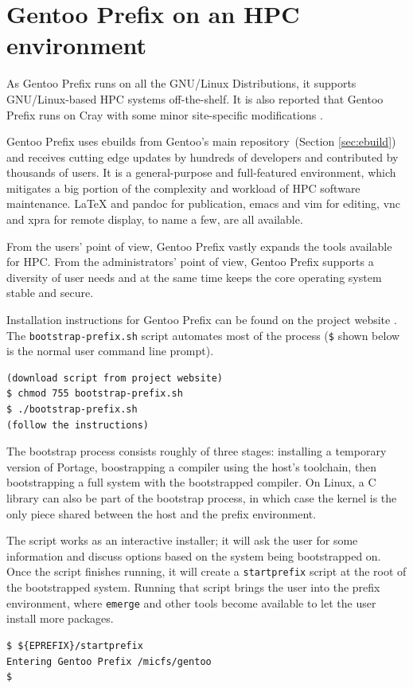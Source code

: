 \documentclass[a4paper,conference]{IEEEtran}
\begin{document}

\section{Gentoo Prefix on an HPC environment}
As Gentoo Prefix runs on all the GNU/Linux Distributions, it supports
GNU/Linux-based HPC systems off-the-shelf. It is also reported that
Gentoo Prefix runs on Cray with some minor site-specific modifications
\cite{cray}.

Gentoo Prefix uses ebuilds from Gentoo's main repository~(Section
\ref{sec:ebuild}) and receives cutting edge updates by hundreds of
developers and contributed by thousands of users. It is a
general-purpose and full-featured environment, which mitigates a big
portion of the complexity and workload of HPC software
maintenance. \LaTeX{} and pandoc for publication, emacs and vim for
editing, vnc and xpra for remote display, to name a few, are all
available.

From the users' point of view, Gentoo Prefix vastly expands the tools
available for HPC. From the administrators' point of view, Gentoo
Prefix supports a diversity of user needs and at the same time keeps the
core operating system stable and secure.

Installation instructions for Gentoo Prefix can be found on the project
website \cite{gentoo:prefix}. The \texttt{bootstrap-prefix.sh} script
automates most of the process (\texttt{\$} shown below is the normal
user command line prompt).
\begin{verbatim}
(download script from project website)
$ chmod 755 bootstrap-prefix.sh
$ ./bootstrap-prefix.sh
(follow the instructions)
\end{verbatim}

The bootstrap process consists roughly of three stages: installing a
temporary version of Portage, boostrapping a compiler using the host's
toolchain, then bootstrapping a full system with the bootstrapped
compiler. On Linux, a C library can also be part of the bootstrap
process, in which case the kernel is the only piece shared between the
host and the prefix environment.

The script works as an interactive installer; it will ask the user for
some information and discuss options based on the system being
bootstrapped on. Once the script finishes running, it will create a
\texttt{startprefix} script at the root of the bootstrapped system.
Running that script brings the user into the prefix environment, where
\texttt{emerge} and other tools become available to let the user install
more packages.
\begin{verbatim}
$ ${EPREFIX}/startprefix
Entering Gentoo Prefix /micfs/gentoo
$
\end{verbatim}
\end{document}
